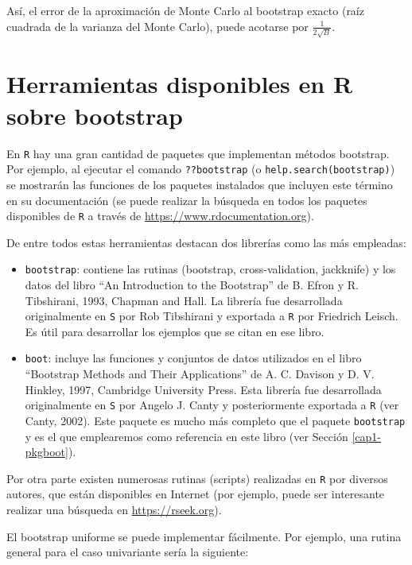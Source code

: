 \documentclass[]{book}
\theoremstyle{definition}
\theoremstyle{definition}
\theoremstyle{definition}
\theoremstyle{remark}
\begin{document}
Así, el error de la aproximación de Monte Carlo al bootstrap exacto
(raíz cuadrada de la varianza del Monte Carlo), puede acotarse por
\(\frac{1}{2\sqrt{B}}\).

\section{Herramientas disponibles en R sobre
bootstrap}\label{cap1-paquetes}

En \texttt{R} hay una gran cantidad de paquetes que implementan métodos
bootstrap. Por ejemplo, al ejecutar el comando \texttt{??bootstrap} (o
\texttt{help.search(\textquotesingle{}bootstrap\textquotesingle{})}) se
mostrarán las funciones de los paquetes instalados que incluyen este
término en su documentación (se puede realizar la búsqueda en todos los
paquetes disponibles de \texttt{R} a través de
\url{https://www.rdocumentation.org}).

De entre todos estas herramientas destacan dos librerías como las más
empleadas:

\begin{itemize}
\item
  \texttt{bootstrap}: contiene las rutinas (bootstrap, cross-validation,
  jackknife) y los datos del libro ``An Introduction to the Bootstrap''
  de B. Efron y R. Tibshirani, 1993, Chapman and Hall. La librería fue
  desarrollada originalmente en \texttt{S} por Rob Tibshirani y
  exportada a \texttt{R} por Friedrich Leisch. Es útil para desarrollar
  los ejemplos que se citan en ese libro.
\item
  \texttt{boot}: incluye las funciones y conjuntos de datos utilizados
  en el libro ``Bootstrap Methods and Their Applications'' de A. C.
  Davison y D. V. Hinkley, 1997, Cambridge University Press. Esta
  librería fue desarrollada originalmente en \texttt{S} por Angelo J.
  Canty y posteriormente exportada a \texttt{R} (ver Canty, 2002). Este
  paquete es mucho más completo que el paquete \texttt{bootstrap} y es
  el que emplearemos como referencia en este libro (ver Sección
  \ref{cap1-pkgboot}).
\end{itemize}

Por otra parte existen numerosas rutinas (scripts) realizadas en
\texttt{R} por diversos autores, que están disponibles en Internet (por
ejemplo, puede ser interesante realizar una búsqueda en
\url{https://rseek.org}).

El bootstrap uniforme se puede implementar fácilmente. Por ejemplo, una
rutina general para el caso univariante sería la siguiente:
\end{document}
